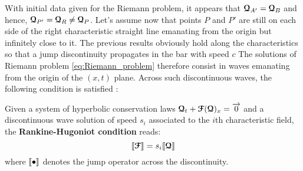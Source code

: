 With initial data given for the Riemann problem, it appears that ${\boldsymbol{\mathcal{Q}}}_{A'}={\boldsymbol{\mathcal{Q}}}_{B}$ and hence, ${\boldsymbol{\mathcal{Q}}}_{P'}={\boldsymbol{\mathcal{Q}}}_{R} \ne {\boldsymbol{\mathcal{Q}}}_{P}$. Let's assume now that points $P$ and $P'$ are still on each side of the right characteristic straight line emanating from the origin but infinitely close to it. The previous results obviously hold along the characteristics so that a jump discontinuity propagates in the bar with speed $c$ The solutions of Riemann problem \eqref{eq:Riemann_problem} therefore consist in waves emanating from the origin of the $(x,t)$ plane. Across such discontinuous waves, the following condition is satisfied \cite{Toro}:
\begin{definition}
Given a system of hyperbolic conservation laws ${\boldsymbol{\mathcal{Q}}}_t + {\boldsymbol{\mathcal{F}}}({\boldsymbol{\mathcal{Q}}})_x={\overrightarrow{0}}$ and a discontinuous wave solution of speed $s_i$ associated to the $i$th characteristic field, the \textbf{Rankine-Hugoniot condition} reads:
\begin{equation}
  \label{eq:rankine-hugoniot}
  \llbracket  {\boldsymbol{\mathcal{F}}} \rrbracket = s_i \llbracket  {\boldsymbol{\mathcal{Q}}} \rrbracket
\end{equation}
where $\llbracket \bullet \rrbracket$ denotes the jump operator across the discontinuity.  
\end{definition}

